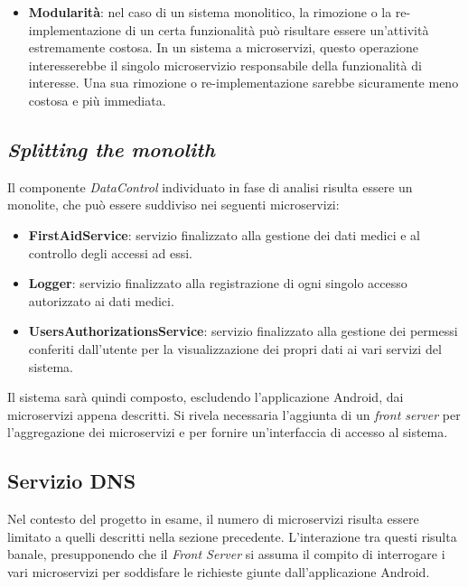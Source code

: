 \documentclass[a4paper,12pt]{report}
\begin{document}
\begin{itemize}
	\item \textbf{Modularità}: nel caso di un sistema monolitico, la rimozione o la re-implementazione di un certa funzionalità può risultare essere un'attività estremamente costosa. In un sistema a microservizi, questo operazione interesserebbe il singolo microservizio responsabile della funzionalità di interesse. Una sua rimozione o re-implementazione sarebbe sicuramente meno costosa e più immediata.
\end{itemize}


\subsection{\emph{Splitting the monolith}} \label{splitting}

Il componente \emph{DataControl} individuato in fase di analisi risulta essere un monolite, che può essere suddiviso nei seguenti microservizi:

\begin{itemize}
	\item \textbf{FirstAidService}: servizio finalizzato alla gestione dei dati medici e al controllo degli accessi ad essi. 
	\item \textbf{Logger}: servizio finalizzato alla registrazione di ogni singolo accesso autorizzato ai dati medici.
	\item \textbf{UsersAuthorizationsService}: servizio finalizzato alla gestione dei permessi conferiti dall'utente per la visualizzazione dei propri dati ai vari servizi del sistema. 
\end{itemize}

Il sistema sarà quindi composto, escludendo l'applicazione Android, dai microservizi appena descritti. Si rivela necessaria l'aggiunta di un \emph{front server} per l'aggregazione dei microservizi e per fornire un'interfaccia di accesso al sistema.

\subsection{Servizio DNS}

Nel contesto del progetto in esame, il numero di microservizi risulta essere limitato a quelli descritti nella sezione precedente. L'interazione tra questi risulta banale, presupponendo che il \emph{Front Server} si assuma il compito di interrogare i vari microservizi per soddisfare le richieste giunte dall'applicazione Android.
\end{document}

